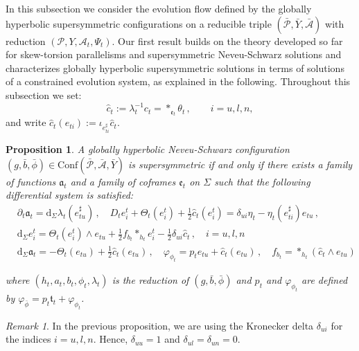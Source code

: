 \documentclass[10pt,reqno,a4paper]{amsart}
\theoremstyle{plain}
\newtheorem{prop}[thm]{Proposition}
\theoremstyle{definition}
\theoremstyle{remark}
\newtheorem{remark}[thm]{Remark}
\theoremstyle{remark}
\def\dd{\mathrm{d}}
\def\Conf{\mathrm{Conf}}
\def\cA{\mathcal{A}}
\def\cP{\mathcal{P}}
\def\fra{\mathfrak{a}}
\def\fre{\mathfrak{e}}
\renewcommand{\(}{ (}
\renewcommand{\)}{ )}
\begin{document}
In this subsection we consider the evolution flow defined by the globally hyperbolic supersymmetric configurations on a reducible triple $(\bar{\cP},\bar{Y},\bar{\cA})$ with reduction $(\cP,Y,\cA_t,\Psi_t)$. Our first result builds on the theory developed so far for skew-torsion parallelisms and supersymmetric Neveu-Schwarz solutions and characterizes globally hyperbolic supersymmetric solutions in terms of solutions of a constrained evolution system, as explained in the following. Throughout this subsection we set:
\begin{equation*}
\widehat{c}_t:=\lambda_t^{-1}c_t=\ast_{\fre_t}\theta_t\, ,  \qquad i=u,l,n,
\end{equation*}
and write $\widehat{c}_t(e_{ti}):=\iota_{e^{\sharp}_{ti}}\widehat{c}_t$.

\begin{prop}
\label{prop:susyevol}
A globally hyperbolic Neveu-Schwarz configuration $(g,\bar{b},\bar{\phi})\in \Conf(\bar{\cP},\bar{\cA},\bar{Y})$ is supersymmetric if and only if there exists a family of functions $\fra_t$ and a family of coframes $\fre_t$ on $\Sigma$ such that the following differential system is satisfied:
\begin{eqnarray}
& \partial_t \fra_t = \dd_{\Sigma}\lambda_t(e^{\sharp}_{tu})\, , \quad D_t e^t_i + \Theta_t(e^t_i)+\frac{1}{2}\widehat{c}_t(e^t_i)=\delta_{ui}\eta_t-\eta_t(e^{\sharp}_{ti})e_{tu}\, ,  \nonumber \\
& \dd_{\Sigma}e^t_i=\Theta_t(e^t_i)\wedge e_{tu}+\frac{1}{2}f_{b_t}\ast_{h_t}e^t_i-\frac{1}{2}\delta_{ui}\widehat{c}_t\, , \quad i=u,l,n \label{eq:susyevol} \\
& \dd_\Sigma\fra_t=-\Theta_t(e_{tu})+\tfrac12\widehat{c}_t (e_{tu})\, , \quad \varphi_{\phi_t}=p_t e_{tu}+\widehat{c}_t(e_{tu})\, , \quad f_{b_t}=\ast_{h_t}(\widehat{c}_t\wedge e_{tu})\nonumber
\end{eqnarray}

\noindent
where $(h_t,a_t,b_t,\phi_t,\lambda_t)$ is the reduction of $(g,\bar{b},\bar{\phi})$ and $p_t$ and $\varphi_{\phi_t}$ are defined by $\varphi_{\bar\phi}=p_t\mathfrak t_t+\varphi_{\phi_t}$.
\end{prop} 


\begin{remark}
In the previous proposition, we are using the Kronecker delta $\delta_{ui}$ for the indices $i = u, l, n$. Hence, $\delta_{uu} = 1$ and $\delta_{ul} = \delta_{un} = 0$. 
\end{remark}
\end{document}
